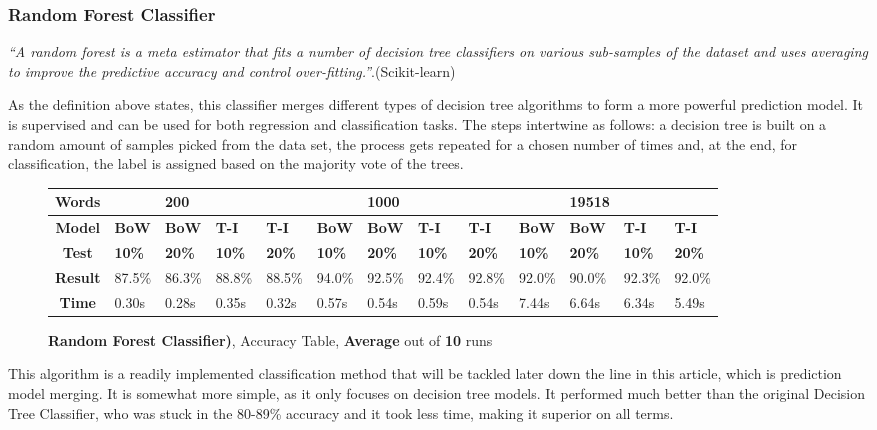 \documentclass{article}
\begin{document}
	\subsubsection{Random Forest Classifier}
	\par \textit{``A random forest is a meta estimator that fits a number of decision tree classifiers on various sub-samples of the dataset and uses averaging to improve the predictive accuracy and control over-fitting.''}.(Scikit-learn)
	\par As the definition above states, this classifier merges different types of decision tree algorithms to form a more powerful prediction model. It is supervised and can be used for both regression and classification tasks. The steps intertwine as follows: a decision tree is built on a random amount of samples picked from the data set, the process gets repeated for a chosen number of times and, at the end, for classification, the label is assigned based on the majority vote of the trees.
	\begin{figure}[!h]
		\begin{tabular}{||c||l|l|l|l||l|l|l|l||l|l|l|l||}
			\hline
			\textbf{Words} &  & \textbf{200} & & & &\textbf{1000} & & & & \textbf{19518} &  & \\ \hline 
			\textbf{Model} & \textbf{BoW} & \textbf{BoW} & \textbf{T-I} & \textbf{T-I} &\textbf{BoW} & \textbf{BoW} & \textbf{T-I} & \textbf{T-I} & \textbf{BoW} & \textbf{BoW} & \textbf{T-I} & \textbf{T-I}\\ \hline
			\textbf{Test} & \textbf{10\%} & \textbf{20\%} & \textbf{10\%} & \textbf{20\%} & \textbf{10\%} & \textbf{20\%} & \textbf{10\%} & \textbf{20\%} & \textbf{10\%} & \textbf{20\%} & \textbf{10\%} & \textbf{20\%} \\ \hline \hline  
			\textbf{Result} &87.5\% & 86.3\% & 88.8\% & 88.5\% & 94.0\% & 92.5\% & 92.4\% & 92.8\% & 92.0\% & 90.0\% & 92.3\% & 92.0\% \\ \hline 
			\textbf{Time} & 0.30s & 0.28s & 0.35s & 0.32s & 0.57s & 0.54s & 0.59s & 0.54s & 7.44s & 6.64s & 6.34s & 5.49s \\ \hline 
		\end{tabular}
		\caption{\textbf{Random Forest Classifier)}, Accuracy Table, \textbf{Average} out of \textbf{10} runs}
	\end{figure}
	\par This algorithm is a readily implemented classification method that will be tackled later down the line in this article, which is prediction model merging. It is somewhat more simple, as it only focuses on decision tree models. It performed much better than the original Decision Tree Classifier, who was stuck in the 80-89\% accuracy and it took less time, making it superior on all terms. 	
\end{document}
